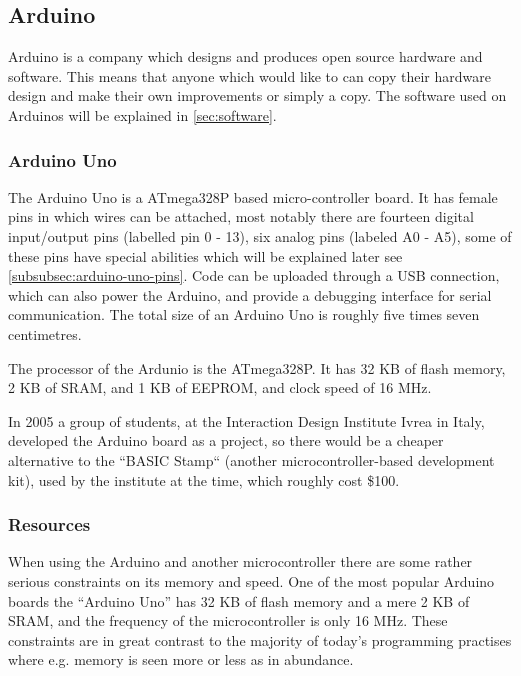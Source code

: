 
\subsection{Arduino}
Arduino is a company which designs and produces open source hardware and software.
This means that anyone which would like to can copy their hardware design and make their own improvements or simply a copy.
The software used on Arduinos will be explained in \ref{sec:software}.

\subsubsection{Arduino Uno}
The Arduino Uno is a ATmega328P based micro-controller board.
It has female pins in which wires can be attached, most notably there are fourteen digital input/output pins (labelled pin 0 - 13), six analog pins (labeled A0 - A5), some of these pins have special abilities which will be explained later see \ref{subsubsec:arduino-uno-pins}.
Code can be uploaded through a USB connection, which can also power the Arduino, and provide a debugging interface for serial communication.
The total size of an Arduino Uno is roughly five times seven centimetres. 

The processor of the Ardunio is the ATmega328P.
It has 32 KB of flash memory, 2 KB of SRAM, and 1 KB of EEPROM, and clock speed of 16 MHz.

\begin{tcolorbox}[floatplacement=b,float,colback=white!5,colframe=aaublue!50,title=The Birth of the Arduino]
In 2005 a group of students, at the Interaction Design Institute Ivrea in Italy, developed the Arduino board as a project, so there would be a cheaper alternative to the ``BASIC Stamp`` (another microcontroller-based development kit), used by the institute at the time, which roughly cost \$100. \cite{birthofarduino}
\end{tcolorbox}

\subsubsection{Resources}
When using the Arduino and another microcontroller there are some rather serious constraints on its memory and speed.
One of the most popular Arduino boards the ``Arduino Uno'' has 32 KB of flash memory and a mere 2 KB of SRAM, and the frequency of the microcontroller is only 16 MHz.
These constraints are in great contrast to the majority of today's programming practises where e.g. memory is seen more or less as in abundance. 
